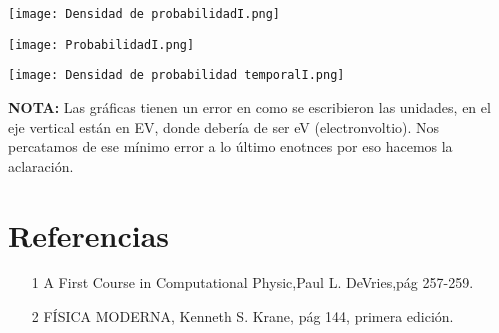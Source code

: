 \documentclass{article}
\begin{document}
\medskip

\texttt{[image: Densidad de probabilidadI.png]}

\medskip

\texttt{[image: ProbabilidadI.png]}

\medskip

\texttt{[image: Densidad de probabilidad temporalI.png]}


\textbf{NOTA:} Las gráficas tienen un error en como se escribieron las unidades, en el eje vertical están en EV, donde debería de ser eV (electronvoltio). Nos percatamos de ese mínimo error a lo último enotnces por eso hacemos la aclaración. 










\section{Referencias}

\begin{itemize}
    \item[1] A First Course in Computational Physic,Paul L. DeVries,pág 257-259.
    \item [2] FÍSICA MODERNA, Kenneth S. Krane, pág 144, primera edición.
\end{itemize}
\end{document}
